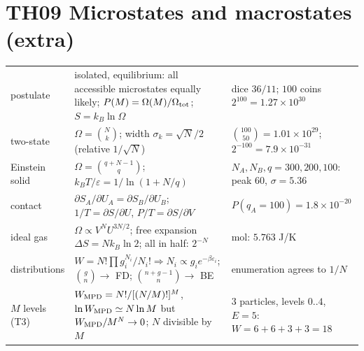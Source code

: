 \documentclass[9pt]{article}
\begin{document}
\section*{TH09 Microstates and macrostates (extra)}
\begin{tabular}{@{}p{2.9cm}p{8.4cm}p{6.1cm}@{}}
\toprule
postulate & isolated, equilibrium: all accessible microstates equally likely; $P(M)=\Omega(M)/\Omega_{\rm tot}$; $S=k_B\ln\Omega$ & dice $36/11$; $100$ coins $2^{100}=1.27\times10^{30}$\\
two-state & $\Omega=\binom Nk$; width $\sigma_k=\sqrt N/2$ (relative $1/\sqrt N$) & $\binom{100}{50}=1.01\times10^{29}$; $2^{-100}=7.9\times10^{-31}$\\
Einstein solid & $\Omega=\binom{q+N-1}q$; $k_BT/\varepsilon=1/\ln(1+N/q)$ & $N_A,N_B,q=300,200,100$: peak $60$, $\sigma=5.36$\\
contact & $\partial S_A/\partial U_A=\partial S_B/\partial U_B$; $1/T=\partial S/\partial U$, $P/T=\partial S/\partial V$ & $P(q_A=100)=1.8\times10^{-20}$\\
ideal gas & $\Omega\propto V^NU^{3N/2}$; free expansion $\Delta S=Nk_B\ln2$; all in half: $2^{-N}$ & mol: $5.763$ J/K\\
distributions & $W=N!\prod g_i^{N_i}/N_i!\Rightarrow N_i\propto g_ie^{-\beta\varepsilon_i}$; $\binom{g}{n}\to$ FD; $\binom{n+g-1}n\to$ BE & enumeration agrees to $1/N$\\
$M$ levels (T3) & $W_{\rm MPD}=N!/[(N/M)!]^M$, $\ln W_{\rm MPD}\simeq N\ln M$ but $W_{\rm MPD}/M^N\to0$; $N$ divisible by $M$ & $3$ particles, levels $0..4$, $E=5$: $W=6+6+3+3=18$\\
\bottomrule
\end{tabular}
\end{document}
